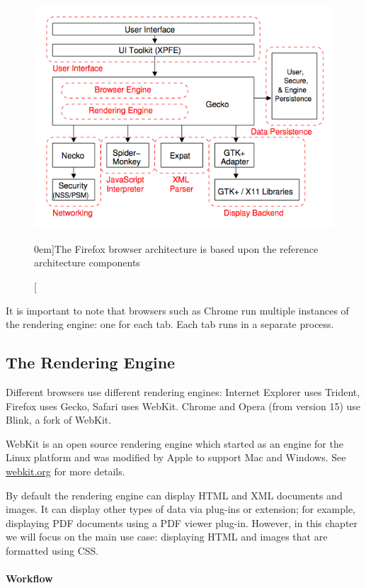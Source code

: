 \documentclass[a4paper, justified, notoc]{tufte-handout} %
\begin{document}
\begin{figure}%
	\centering
  \includegraphics[width=1.0\textwidth]{./figures/mozilla_browser_architecture.png}
  \caption[][0em]{The Firefox browser architecture is based upon the reference architecture components~\citep{grosskurth:2006}}
  \label{fig:mozilla_architecture}
\end{figure}

It is important to note that browsers such as Chrome run multiple instances of the rendering engine: one for each tab. Each tab runs in a separate process.

\subsection{The Rendering Engine} %
\label{sub:the_rendering_engine}
Different browsers use different rendering engines: Internet Explorer uses Trident, Firefox uses Gecko, Safari uses WebKit. Chrome and Opera (from version 15) use Blink, a fork of WebKit.

WebKit is an open source rendering engine which started as an engine for the Linux platform and was modified by Apple to support Mac and Windows. See \url{webkit.org} for more details.

By default the rendering engine can display HTML and XML documents and images. It can display other types of data via plug-ins or extension; for example, displaying PDF documents using a PDF viewer plug-in. However, in this chapter we will focus on the main use case: displaying HTML and images that are formatted using CSS.

\paragraph{Workflow}
\end{document}
